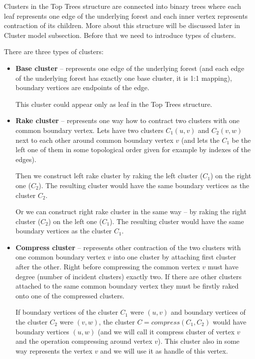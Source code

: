 Clusters in the Top Trees structure are connected into binary trees where each
leaf represents one edge of the underlying forest and each inner vertex represents
contraction of its children. More about this structure will be discussed
later in {\I Cluster model} subsection. Before that we need to introduce types
of clusters.

There are three types of clusters:

\begin{itemize}

\item {\bf Base cluster} -- represents one edge of the underlying forest (and
each edge of the underlying forest has exactly one base cluster, it is 1:1 mapping),
boundary vertices are endpoints of the edge.

This cluster could appear only as leaf in the Top Trees structure.

\item {\bf Rake cluster} -- represents one way how to contract two clusters
with one common boundary vertex. Lets have two clusters $C_1(u,v)$ and
$C_2(v,w)$ next to each other around common boundary vertex $v$ (and lets the
$C_1$ be the left one of them in some topological order given for example by
indexes of the edges).

Then we construct {\I left rake cluster} by {\I raking} the left cluster ($C_1$)
on the right one ($C_2$). The resulting cluster would have the same boundary
vertices as the cluster $C_2$.

Or we can construct {\I right rake cluster} in the same way -- by {\I raking}
the right cluster ($C_2$) on the left one ($C_1$). The resulting cluster would
have the same boundary vertices as the cluster $C_1$.


\item{\bf Compress cluster} -- represents other contraction of the two clusters
with one common boundary vertex $v$ into one cluster by attaching first cluster
after the other. Right before compressing the common vertex $v$ must have degree
(number of incident clusters) exactly two. If there are other clusters attached
to the same common boundary vertex they must be firstly {\I raked} onto one of
the compressed clusters.

If boundary vertices of the cluster $C_1$ were $(u,v)$ and boundary vertices
of the cluster $C_2$ were $(v,w)$, the cluster $C=compress(C_1,C_2)$ would have
boundary vertices $(u,w)$ (and we will call it {\I compress cluster
of vertex $v$} and the operation {\I compressing around vertex $v$}).
This cluster also in some way represents the vertex $v$ and we will use it as
{\I handle} of this vertex.


\end{itemize}

